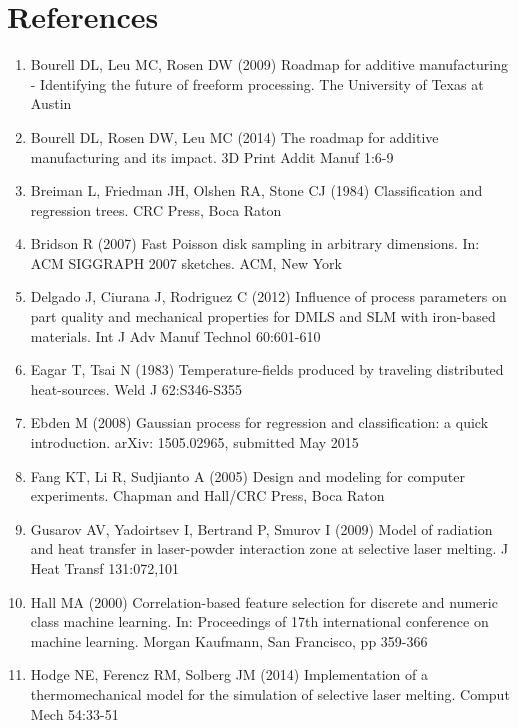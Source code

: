 \documentclass[10pt]{article}
\begin{document}
\section*{References}
\begin{enumerate}
  \item Bourell DL, Leu MC, Rosen DW (2009) Roadmap for additive manufacturing - Identifying the future of freeform processing. The University of Texas at Austin

  \item Bourell DL, Rosen DW, Leu MC (2014) The roadmap for additive manufacturing and its impact. 3D Print Addit Manuf 1:6-9

  \item Breiman L, Friedman JH, Olshen RA, Stone CJ (1984) Classification and regression trees. CRC Press, Boca Raton

  \item Bridson R (2007) Fast Poisson disk sampling in arbitrary dimensions. In: ACM SIGGRAPH 2007 sketches. ACM, New York

  \item Delgado J, Ciurana J, Rodriguez C (2012) Influence of process parameters on part quality and mechanical properties for DMLS and SLM with iron-based materials. Int J Adv Manuf Technol 60:601-610

  \item Eagar T, Tsai N (1983) Temperature-fields produced by traveling distributed heat-sources. Weld J 62:S346-S355

  \item Ebden M (2008) Gaussian process for regression and classification: a quick introduction. arXiv: 1505.02965, submitted May 2015

  \item Fang KT, Li R, Sudjianto A (2005) Design and modeling for computer experiments. Chapman and Hall/CRC Press, Boca Raton

  \item Gusarov AV, Yadoirtsev I, Bertrand P, Smurov I (2009) Model of radiation and heat transfer in laser-powder interaction zone at selective laser melting. J Heat Transf 131:072,101

  \item Hall MA (2000) Correlation-based feature selection for discrete and numeric class machine learning. In: Proceedings of 17th international conference on machine learning. Morgan Kaufmann, San Francisco, pp 359-366

  \item Hodge NE, Ferencz RM, Solberg JM (2014) Implementation of a thermomechanical model for the simulation of selective laser melting. Comput Mech 54:33-51


\end{enumerate}
\end{document}

